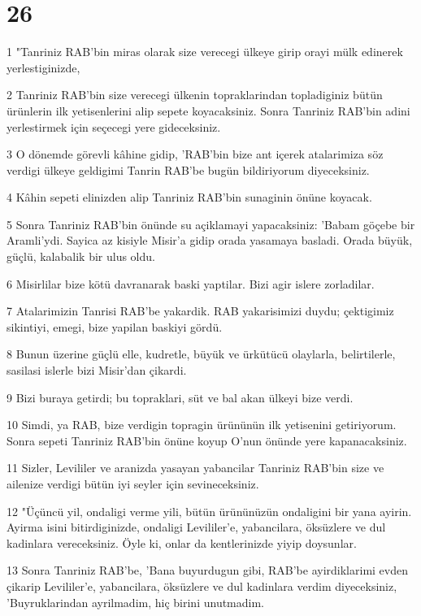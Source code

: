 \chapter{26}

\par 1 "Tanriniz RAB'bin miras olarak size verecegi ülkeye girip orayi mülk edinerek yerlestiginizde,
\par 2 Tanriniz RAB'bin size verecegi ülkenin topraklarindan topladiginiz bütün ürünlerin ilk yetisenlerini alip sepete koyacaksiniz. Sonra Tanriniz RAB'bin adini yerlestirmek için seçecegi yere gideceksiniz.
\par 3 O dönemde görevli kâhine gidip, 'RAB'bin bize ant içerek atalarimiza söz verdigi ülkeye geldigimi Tanrin RAB'be bugün bildiriyorum diyeceksiniz.
\par 4 Kâhin sepeti elinizden alip Tanriniz RAB'bin sunaginin önüne koyacak.
\par 5 Sonra Tanriniz RAB'bin önünde su açiklamayi yapacaksiniz: 'Babam göçebe bir Aramli'ydi. Sayica az kisiyle Misir'a gidip orada yasamaya basladi. Orada büyük, güçlü, kalabalik bir ulus oldu.
\par 6 Misirlilar bize kötü davranarak baski yaptilar. Bizi agir islere zorladilar.
\par 7 Atalarimizin Tanrisi RAB'be yakardik. RAB yakarisimizi duydu; çektigimiz sikintiyi, emegi, bize yapilan baskiyi gördü.
\par 8 Bunun üzerine güçlü elle, kudretle, büyük ve ürkütücü olaylarla, belirtilerle, sasilasi islerle bizi Misir'dan çikardi.
\par 9 Bizi buraya getirdi; bu topraklari, süt ve bal akan ülkeyi bize verdi.
\par 10 Simdi, ya RAB, bize verdigin topragin ürününün ilk yetisenini getiriyorum. Sonra sepeti Tanriniz RAB'bin önüne koyup O'nun önünde yere kapanacaksiniz.
\par 11 Sizler, Levililer ve aranizda yasayan yabancilar Tanriniz RAB'bin size ve ailenize verdigi bütün iyi seyler için sevineceksiniz.
\par 12 "Üçüncü yil, ondaligi verme yili, bütün ürününüzün ondaligini bir yana ayirin. Ayirma isini bitirdiginizde, ondaligi Levililer'e, yabancilara, öksüzlere ve dul kadinlara vereceksiniz. Öyle ki, onlar da kentlerinizde yiyip doysunlar.
\par 13 Sonra Tanriniz RAB'be, 'Bana buyurdugun gibi, RAB'be ayirdiklarimi evden çikarip Levililer'e, yabancilara, öksüzlere ve dul kadinlara verdim diyeceksiniz, 'Buyruklarindan ayrilmadim, hiç birini unutmadim.
